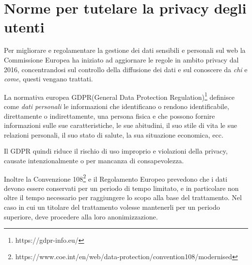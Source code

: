 \section{Norme per tutelare la privacy degli utenti}
Per migliorare e regolamentare la gestione dei dati sensibili e personali sul web la Commissione Europea ha iniziato ad aggiornare le regole in ambito privacy dal 2016, concentrandosi sul controllo della diffusione dei dati e sul conoscere da \textit{chi} e \textit{come}, questi vengano trattati.

La normativa europea GDPR(General Data Protection Regulation)\footnote{https://gdpr-info.eu/} definisce come \textit{dati personali} le informazioni che identificano o rendono identificabile, direttamente o indirettamente, una persona fisica e che possono fornire informazioni sulle sue caratteristiche, le sue abitudini, il suo stile di vita le sue relazioni personali, il suo stato di salute, la sua situazione economica, ecc.

Il GDPR quindi riduce il rischio di uso improprio e violazioni della privacy,
causate intenzionalmente o per mancanza di consapevolezza.

Inoltre la Convenzione 108\footnote{https://www.coe.int/en/web/data-protection/convention108/modernised} e il Regolamento Europeo prevedono che i dati devono
essere conservati per un periodo di tempo limitato, e in particolare non
oltre il tempo necessario per raggiungere lo scopo alla base del trattamento.
Nel caso in cui un titolare del trattamento volesse mantenerli per un periodo
superiore, deve procedere alla loro anonimizzazione.

